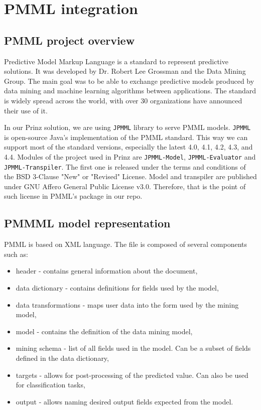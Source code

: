 \chapter{PMML integration}
\label{chap:pmml}

\section{PMML project overview}

Predictive Model Markup Language is a standard to represent predictive solutions.
It was developed by Dr. Robert Lee Grossman and the Data Mining Group.
The main goal was to be able to exchange predictive models produced by data mining
and machine learning algorithms between applications. The standard is widely spread across the world,
with over 30 organizations have announced their use of it.\cite{dmgpage}\cite{pmmlpowered}

In our Prinz solution, we are using \texttt{JPMML} library to serve PMML models. \texttt{JPMML} is open-source Java's
implementation of the PMML standard. This way we can support most of the standard versions, especially the latest
4.0, 4.1, 4.2, 4.3, and 4.4. Modules of the project used in Prinz are \texttt{JPMML-Model},
\texttt{JPMML-Evaluator} and \texttt{JPMML-Transpiler}. The first one is released under the terms and conditions
of the BSD 3-Clause "New" or "Revised" License. Model and transpiler are published under GNU Affero General Public License v3.0.
Therefore, that is the point of such license in PMML's package in our repo.\cite{jpmml}


\section{PMMML model representation}

PMML is based on XML language. The file is composed of several components such as:
\begin{itemize}
    \item header - contains general information about the document,
    \item data dictionary - contains definitions for fields used by the model,
    \item data transformations - maps user data into the form used by the mining model,
    \item model - contains the definition of the data mining model,
    \item mining schema - list of all fields used in the model. Can be a subset of fields defined in the data dictionary,
    \item targets - allows for post-processing of the predicted value. Can also be used for classification tasks,
    \item output - allows naming desired output fields expected from the model.
\end{itemize}


